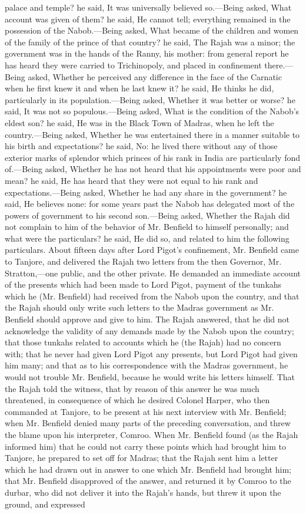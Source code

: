 palace and temple? he said, It was universally believed so.—Being asked, What account was given of them? he said, He cannot tell; everything remained in the possession of the Nabob.—Being asked, What became of the children and women of the family of the prince of that country? he said, The Rajah was a minor; the government was in the hands of the Ranny, his mother: from general report he has heard they were carried to Trichinopoly, and placed in confinement there.—Being asked, Whether he perceived any difference in the face of the Carnatic when he first knew it and when he last knew it? he said, He thinks he did, particularly in its population.—Being asked, Whether it was better or worse? he said, It was not so populous.—Being asked, What is the condition of the Nabob's eldest son? he said, He was in the Black Town of Madras, when he left the country.—Being asked, Whether he was entertained there in a manner suitable to his birth and expectations? he said, No: he lived there without any of those exterior marks of splendor which princes of his rank in India are particularly fond of.—Being asked, Whether he has not heard that his appointments were poor and mean? he said, He has heard that they were not equal to his rank and expectations.—Being asked, Whether he had any share in the government? he said, He believes none: for some years past the Nabob has delegated most of the powers of government to his second son.—Being asked, Whether the Rajah did not complain to him of the behavior of Mr. Benfield to himself personally; and what were the particulars? he said, He did so, and related to him the following particulars. About fifteen days after Lord Pigot's confinement, Mr. Benfield came to Tanjore, and delivered the Rajah two letters from the then Governor, Mr. Stratton,—one public, and the other private. He demanded an immediate account of the presents which had been made to Lord Pigot, payment of the tunkahs which he (Mr. Benfield) had received from the Nabob upon the country, and that the Rajah should only write such letters to the Madras government as Mr. Benfield should approve and give to him. The Rajah answered, that he did not acknowledge the validity of any demands made by the Nabob upon the country; that those tunkahs related to accounts which he (the Rajah) had no concern with; that he never had given Lord Pigot any presents, but Lord Pigot had given him many; and that as to his correspondence with the Madras government, he would not trouble Mr. Benfield, because he would write his letters himself. That the Rajah told the witness, that by reason of this answer he was much threatened, in consequence of which he desired Colonel Harper, who then commanded at Tanjore, to be present at his next interview with Mr. Benfield; when Mr. Benfield denied many parts of the preceding conversation, and threw the blame upon his interpreter, Comroo. When Mr. Benfield found (as the Rajah informed him) that he could not carry these points which had brought him to Tanjore, he prepared to set off for Madras; that the Rajah sent him a letter which he had drawn out in answer to one which Mr. Benfield had brought him; that Mr. Benfield disapproved of the answer, and returned it by Comroo to the durbar, who did not deliver it into the Rajah's hands, but threw it upon the ground, and expressed 